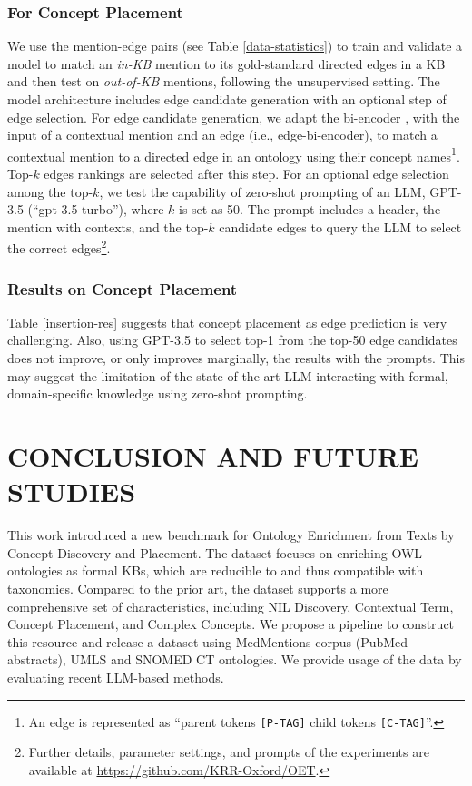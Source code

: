 \documentclass[sigconf]{acmart}
\begin{document}
	\subsubsection*{For Concept Placement} We use the mention-edge pairs (see Table \ref{data-statistics}) to train and validate a model to match an \textit{in-KB} mention to its gold-standard directed edges in a KB and then test on \textit{out-of-KB} mentions, following the unsupervised setting. The model architecture includes edge candidate generation with an optional step of edge selection. For edge candidate generation, we adapt the bi-encoder  \cite{wu2020blink}, with the input of a contextual mention and an edge  (i.e., edge-bi-encoder), to match a contextual mention to a directed edge in an ontology using their concept names\footnote{An edge is represented as ``parent tokens \texttt{[P-TAG]} child tokens \texttt{[C-TAG]}''.}. Top-$k$ edges rankings are selected after this step. For an optional edge selection among the top-$k$, we test the capability of zero-shot prompting of an LLM, GPT-3.5 (``gpt-3.5-turbo''), where $k$ is set as 50. The prompt includes a header, the mention with contexts, and the top-$k$ candidate edges to query the LLM to select the correct edges\footnote{Further details, parameter settings, and prompts of the experiments are available at \url{https://github.com/KRR-Oxford/OET}.}.
	
	\subsubsection*{Results on Concept Placement} 
	Table \ref{insertion-res} suggests that concept placement as edge prediction is very challenging. Also, using GPT-3.5 to select top-1 from the top-50 edge candidates does not improve, or only improves marginally, the results with the prompts. This may suggest the limitation of the state-of-the-art LLM interacting with formal, domain-specific knowledge using zero-shot prompting. 
	
	\section{CONCLUSION AND FUTURE STUDIES}
	This work introduced a new benchmark for Ontology Enrichment from Texts by Concept Discovery and Placement. The dataset focuses on enriching OWL ontologies as formal KBs, which are reducible to and thus compatible with taxonomies. Compared to the prior art, the dataset supports a more comprehensive set of characteristics, including NIL Discovery, Contextual Term, Concept Placement, and Complex Concepts. We propose a pipeline to construct this resource and release a dataset using MedMentions corpus (PubMed abstracts), UMLS and SNOMED CT ontologies. We provide usage of the data by evaluating recent LLM-based methods. 
	
\end{document}
